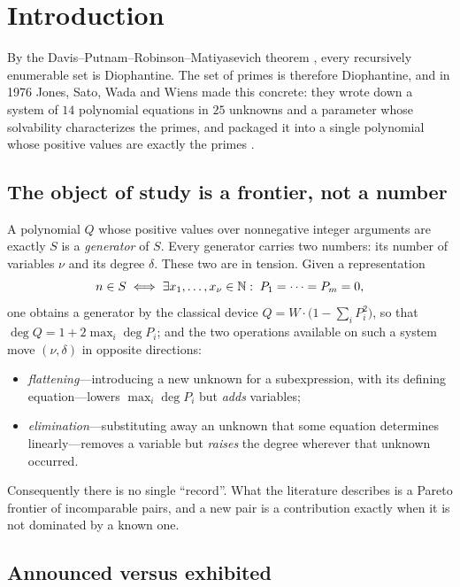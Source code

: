 \section{Introduction}
\label{sec:intro}

By the Davis--Putnam--Robinson--Matiyasevich theorem \cite{matiyasevich1970},
every recursively enumerable set is Diophantine. The set of primes is therefore
Diophantine, and in 1976 Jones, Sato, Wada and Wiens made this concrete: they
wrote down a system of $14$ polynomial equations in $25$ unknowns and a
parameter whose solvability characterizes the primes, and packaged it into a
single polynomial whose positive values are exactly the primes
\cite{jsww1976}.

\subsection{The object of study is a frontier, not a number}

A polynomial $Q$ whose positive values over nonnegative integer arguments are
exactly $S$ is a \emph{generator} of $S$. Every generator carries two numbers:
its number of variables $\nu$ and its degree $\delta$. These two are in
tension. Given a representation
\[
  n\in S \iff \exists x_1,\dots,x_\nu\in\mathbb{N}:\; P_1=\dots=P_m=0 ,
\]
one obtains a generator by the classical device
$Q=W\cdot\bigl(1-\sum_i P_i^2\bigr)$, so that
$\deg Q = 1 + 2\max_i \deg P_i$; and the two operations available on such a
system move $(\nu,\delta)$ in opposite directions:

\begin{itemize}[nosep]
  \item \emph{flattening}---introducing a new unknown for a subexpression, with
        its defining equation---lowers $\max_i\deg P_i$ but \emph{adds}
        variables;
  \item \emph{elimination}---substituting away an unknown that some equation
        determines linearly---removes a variable but \emph{raises} the degree
        wherever that unknown occurred.
\end{itemize}

Consequently there is no single ``record''. What the literature describes is a
Pareto frontier of incomparable pairs, and a new pair is a contribution exactly
when it is not dominated by a known one.

\subsection{Announced versus exhibited}


